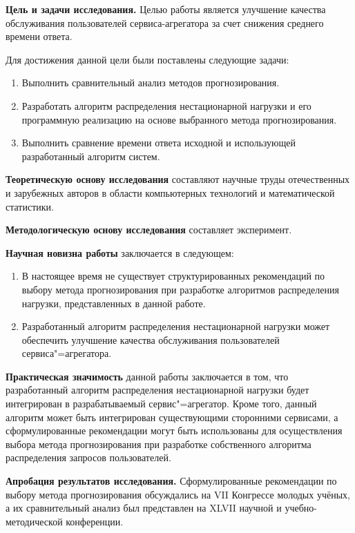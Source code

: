 \documentclass[a4paper,14pt,russian]{extreport}
\begin{document}
{\bfseries Цель и задачи исследования.}  Целью работы является улучшение 
качества обслуживания пользователей сервиса-агрегатора за счет снижения 
среднего времени ответа.

Для достижения данной цели были поставлены следующие задачи:
\begin{enumerate}
	\item Выполнить сравнительный анализ методов прогнозирования.
	\item Разработать алгоритм распределения нестационарной нагрузки и его 
		программную реализацию на основе выбранного метода 
		прогнозирования.
	\item Выполнить сравнение времени ответа исходной и использующей 
		разработанный алгоритм систем.
\end{enumerate}

{\bfseries Теоретическую основу исследования} составляют научные труды
отечественных и зарубежных авторов в области компьютерных технологий и
математической статистики.

{\bfseries Методологическую основу исследования} составляет эксперимент.

{\bfseries Научная новизна работы} заключается в следующем:
\begin{enumerate}
	\item В настоящее время не существует структурированных рекомендаций 
		по выбору метода прогнозирования при разработке алгоритмов 
		распределения нагрузки, представленных в данной работе. 
	\item Разработанный алгоритм распределения нестационарной нагрузки 
		может обеспечить улучшение качества обслуживания пользователей
		сервиса"=агрегатора.
\end{enumerate}

{\bfseries Практическая значимость} данной работы заключается в том, что 
разработанный алгоритм распределения нестационарной нагрузки будет
интегрирован в разрабатываемый сервис"=агрегатор. Кроме того, данный 
алгоритм может быть интегрирован существующими сторонними сервисами, а 
сформулированные рекомендации могут быть использованы для осуществления 
выбора метода прогнозирования при разработке собственного алгоритма 
распределения запросов пользователей.

{\bfseries Апробация результатов исследования.} Сформулированные 
рекомендации по выбору метода прогнозирования обсуждались на VII Конгрессе 
молодых учёных, а их сравнительный анализ был представлен на XLVII научной 
и учебно-методической конференции.
\end{document}
